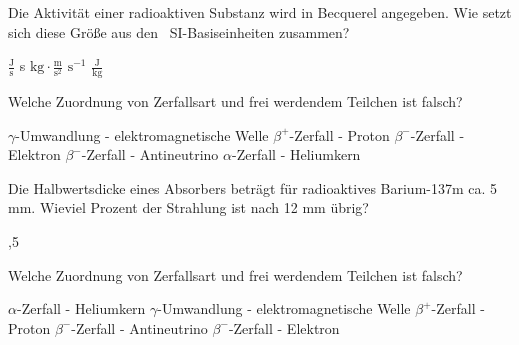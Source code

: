 \documentclass[11pt]{exam}
\begin{document}
\setlength{\voffset}{-0.5in}
\setlength{\headsep}{5pt}

\hspace{2mm}
 \hspace{5mm}
\vspace{4mm}

\begin{questions}

\question Die Aktivität einer radioaktiven Substanz wird in Becquerel angegeben. Wie setzt sich diese Größe aus den  SI-Basiseinheiten zusammen?

\begin{choices}
	\choice \( \frac{\text{J}}{\text{s}} \)
	\choice s
	\choice \( \text{kg}\cdot\frac{\text{m}}{\text{s}^2} \)
	\choice \( \text{s}^{-1} \)
	\choice \( \frac{\text{J}}{\text{kg}} \)
\end{choices}

\vspace{3mm}\question Welche Zuordnung von Zerfallsart und frei werdendem Teilchen ist falsch?

\begin{choices}
	\choice \( \gamma \)-Umwandlung - elektromagnetische Welle
	\choice \( \beta^+ \)-Zerfall - Proton
	\choice \( \beta^- \)-Zerfall - Elektron
	\choice \( \beta^- \)-Zerfall - Antineutrino
	\choice \( \alpha \)-Zerfall - Heliumkern
\end{choices}

\vspace{3mm}\question Die Halbwertsdicke eines Absorbers beträgt für radioaktives Barium-137m ca. 5 mm. Wieviel Prozent der Strahlung ist nach 12 mm übrig?

\begin{choices}
	,5 %
\end{choices}

\vspace{3mm}\question Welche Zuordnung von Zerfallsart und frei werdendem Teilchen ist falsch?

\begin{choices}
	\choice \( \alpha \)-Zerfall - Heliumkern
	\choice \( \gamma \)-Umwandlung - elektromagnetische Welle
	\choice \( \beta^+ \)-Zerfall - Proton
	\choice \( \beta^- \)-Zerfall - Antineutrino
	\choice \( \beta^- \)-Zerfall - Elektron
\end{choices}


\end{questions}
\end{document}
